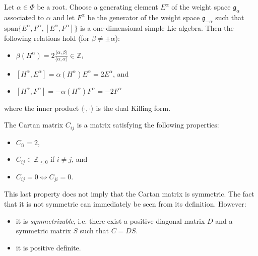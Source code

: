     \begin{property}
        Let $\alpha\in\Phi$ be a root. Choose a generating element $E^\alpha$ of the weight space $\mathfrak{g}_\alpha$ associated to $\alpha$ and let $F^\alpha$ be the generator of the weight space $\mathfrak{g}_{-\alpha}$ such that $\text{span}\{E^\alpha,F^\alpha,[E^\alpha,F^\alpha]\}$ is a one-dimensional simple Lie algebra. Then the following relations hold (for $\beta\neq\pm\alpha$):
        \begin{itemize}
            \item $\beta(H^\alpha) = 2\frac{\langle\alpha, \beta\rangle}{\langle\alpha, \alpha\rangle}\in\mathbb{Z}$,
            \item $[H^\alpha,E^\alpha] = \alpha(H^\alpha)E^\alpha = 2E^\alpha$, and
            \item $[H^\alpha,F^\alpha] = -\alpha(H^\alpha)F^\alpha = -2F^\alpha$
        \end{itemize}
        where the inner product $\langle\cdot,\cdot\rangle$ is the dual Killing form.
    \end{property}

    \begin{property}\label{lie:cartan_prop}
        The Cartan matrix $C_{ij}$ is a matrix satisfying the following properties:
        \begin{itemize}
            \item $C_{ii}=2$,
            \item $C_{ij}\in\mathbb{Z}_{\leq0}$ if $i\neq j$, and
            \item $C_{ij}=0\iff C_{ji}=0$.
        \end{itemize}
        This last property does not imply that the Cartan matrix is symmetric. The fact that it is not symmetric can immediately be seen from its definition. However:
        \begin{itemize}
            \item it is \textit{symmetrizable}, i.e. there exist a positive diagonal matrix $D$ and a symmetric matrix $S$ such that $C=DS$.
            \item it is positive definite.
        \end{itemize}
    \end{property}

